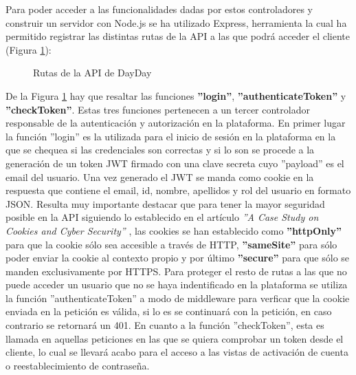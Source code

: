 Para poder acceder a las funcionalidades dadas por estos controladores y construir un servidor con Node.js se ha utilizado Express, herramienta la cual ha permitido registrar las distintas rutas de la API a las que podrá acceder el cliente (Figura \ref{fig:rutas}): 

\begin{figure}[H]
    \caption{Rutas de la API de DayDay}
    \label{fig:rutas}
\end{figure}

De la Figura \ref{fig:rutas} hay que resaltar las funciones \textbf{''login''}, \textbf{''authenticateToken''} y \textbf{''checkToken''}. Estas tres funciones pertenecen a un tercer controlador responsable de la autenticación y autorización en la plataforma. En primer lugar la función ''login'' es la utilizada para el inicio de sesión en la plataforma en la que se chequea si las credenciales son correctas y si lo son se procede a la generación de un token JWT firmado con una clave secreta cuyo ''payload'' es el email del usuario. Una vez generado el JWT se manda como cookie en la respuesta que contiene el email, id, nombre, apellidos y rol del usuario en formato JSON. Resulta muy importante destacar que para tener la mayor seguridad posible en la API siguiendo lo establecido en el artículo \textit{''A Case Study on Cookies and Cyber Security''} \cite{kumawatcase}, las cookies se han establecido como \textbf{''httpOnly''} para que la cookie sólo sea accesible a través de HTTP, \textbf{''sameSite''} para sólo poder enviar la cookie al contexto propio y por último \textbf{''secure''} para que sólo se manden exclusivamente por HTTPS. Para proteger el resto de rutas a las que no puede acceder un usuario que no se haya indentificado en la plataforma se utiliza la función ''authenticateToken'' a modo de middleware para verficar que la cookie enviada en la petición es válida, si lo es se continuará con la petición, en caso contrario se retornará un 401. En cuanto a la función ''checkToken'', esta es llamada en aquellas peticiones en las que se quiera comprobar un token desde el cliente, lo cual se llevará acabo para el acceso a las vistas de activación de cuenta o reestablecimiento de contraseña. \bigskip

